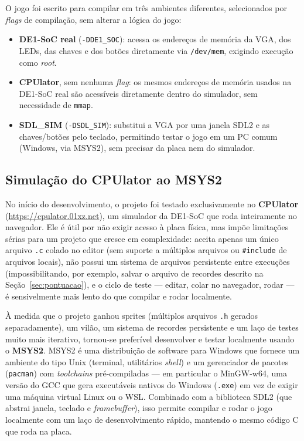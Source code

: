 \documentclass[a4paper,12pt]{article}
\newcommand{\code}[1]{\texttt{#1}}
\begin{document}
O jogo foi escrito para compilar em três ambientes diferentes, selecionados
por \emph{flags} de compilação, sem alterar a lógica do jogo:

\begin{itemize}
    \item \textbf{DE1-SoC real} (\code{-DDE1\_SOC}): acessa os endereços de
    memória da VGA, dos LEDs, das chaves e dos botões diretamente via
    \code{/dev/mem}, exigindo execução como \emph{root}.
    \item \textbf{CPUlator}, sem nenhuma \emph{flag}: os mesmos endereços de
    memória usados na DE1-SoC real são acessíveis diretamente dentro do
    simulador, sem necessidade de \code{mmap}.
    \item \textbf{SDL\_SIM} (\code{-DSDL\_SIM}): substitui a VGA por uma janela
    SDL2 e as chaves/botões pelo teclado, permitindo testar o jogo em um PC
    comum (Windows, via MSYS2), sem precisar da placa nem do simulador.
\end{itemize}

\subsection{Simulação do CPUlator ao MSYS2}

No início do desenvolvimento, o projeto foi testado exclusivamente no
\textbf{CPUlator} (\url{https://cpulator.01xz.net}), um simulador da DE1-SoC
que roda inteiramente no navegador. Ele é útil por não exigir acesso à placa
física, mas impõe limitações sérias para um projeto que cresce em
complexidade: aceita apenas um único arquivo \code{.c} colado no editor (sem
suporte a múltiplos arquivos ou \code{\#include} de arquivos locais), não
possui um sistema de arquivos persistente entre execuções (impossibilitando,
por exemplo, salvar o arquivo de recordes descrito na
Seção~\ref{sec:pontuacao}), e o ciclo de teste --- editar, colar no navegador,
rodar --- é sensivelmente mais lento do que compilar e rodar localmente.

À medida que o projeto ganhou sprites (múltiplos arquivos \code{.h} gerados
separadamente), um vilão, um sistema de recordes persistente e um laço de
testes muito mais iterativo, tornou-se preferível desenvolver e testar
localmente usando o \textbf{MSYS2}. MSYS2 é uma distribuição de software para
Windows que fornece um ambiente do tipo Unix (terminal, utilitários
\emph{shell}) e um gerenciador de pacotes (\code{pacman}) com \emph{toolchains}
pré-compiladas --- em particular o MinGW-w64, uma versão do GCC que gera
executáveis nativos do Windows (\code{.exe}) em vez de exigir uma máquina
virtual Linux ou o WSL. Combinado com a biblioteca SDL2 (que abstrai janela,
teclado e \emph{framebuffer}), isso permite compilar e rodar o jogo
localmente com um laço de desenvolvimento rápido, mantendo o mesmo código
C que roda na placa.
\end{document}
